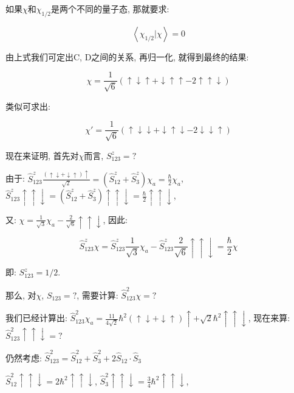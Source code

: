 如果$\chi$和$\chi_{1/2}$是两个不同的量子态, 那就要求:

\begin{equation*}
\left\langle {\chi _{1/2} |\chi } \right\rangle  = 0
\end{equation*}

由上式我们可定出C, D之间的关系, 再归一化, 就得到最终的结果:

\begin{equation*}
\chi = \frac{1} {{\sqrt 6 }}\left( { \uparrow  \downarrow \uparrow +
\downarrow  \uparrow  \uparrow  - 2 \uparrow  \uparrow \downarrow }
\right)
\end{equation*}

类似可求出:

\begin{equation*}
\chi' = \frac{1} {{\sqrt 6 }}\left( { \uparrow  \downarrow
\downarrow + \downarrow  \uparrow  \downarrow - 2 \downarrow
\downarrow  \uparrow } \right)
\end{equation*}

现在来证明, 首先对$\chi$而言, $S_{123}^z= ?$

由于: $\hat S_{123}^z \frac{(\uparrow \downarrow + \downarrow
\uparrow)\uparrow }{\sqrt 2} = (\hat S_{12}^z + \hat S_3^z) \chi_a =
\frac{\hbar}{2} \chi_a$, $\hat S_{123}^z \uparrow \uparrow
\downarrow = (\hat S_{12}^z + \hat S_3^z)\uparrow \uparrow
\downarrow = \frac{\hbar}{2}\uparrow \uparrow \downarrow $,

又: $\chi = \frac{1}{\sqrt 3} \chi_a - \frac{2}{\sqrt 6}\uparrow
\uparrow \downarrow$, 因此:

\begin{equation*}
\hat S_{123}^z \chi = \hat S_{123}^z \frac{1}{\sqrt 3} \chi_a - \hat
S_{123}^z \frac{2}{\sqrt 6}\uparrow \uparrow \downarrow =
\frac{\hbar}{2} \chi
\end{equation*}

即: $S_{123}^z = 1/2$.



那么, 对$\chi$, $S_{123}=?$, 需要计算: $\hat S_{123}^2 \chi = ?$

我们已经计算出: $\hat S_{123}^2 \chi_a = \frac{11}{4 \sqrt 2}\hbar^2
\left( \uparrow\downarrow+\downarrow\uparrow \right) \uparrow +
\sqrt 2 \hbar^2 \uparrow \uparrow \downarrow$, 现在来算: $\hat
S_{123}^2 \uparrow \uparrow \downarrow =?$

仍然考虑: $\hat S_{123}^2 = \hat S_{12}^2 + \hat S_3^2 + 2 \hat
S_{12} \cdot \hat S_3$

$\hat S_{12}^2 \uparrow\uparrow\downarrow = 2\hbar^2
\uparrow\uparrow\downarrow$, $\hat S_3^2 \uparrow\uparrow\downarrow
= \frac{3}{4}\hbar^2 \uparrow\uparrow\downarrow$,


